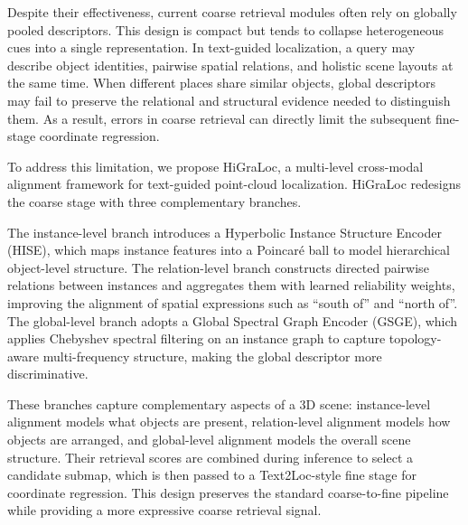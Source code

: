 \documentclass{article}
\begin{document}
Despite their effectiveness, current coarse retrieval modules often rely on globally pooled descriptors. This design is compact but tends to collapse heterogeneous cues into a single representation. In text-guided localization, a query may describe object identities, pairwise spatial relations, and holistic scene layouts at the same time. When different places share similar objects, global descriptors may fail to preserve the relational and structural evidence needed to distinguish them. As a result, errors in coarse retrieval can directly limit the subsequent fine-stage coordinate regression.

To address this limitation, we propose HiGraLoc, a multi-level cross-modal alignment framework for text-guided point-cloud localization. HiGraLoc redesigns the coarse stage with three complementary branches. 

The instance-level branch introduces a Hyperbolic Instance Structure Encoder (HISE), which maps instance features into a Poincaré ball to model hierarchical object-level structure. The relation-level branch constructs directed pairwise relations between instances and aggregates them with learned reliability weights, improving the alignment of spatial expressions such as ``south of'' and ``north of''. The global-level branch adopts a Global Spectral Graph Encoder (GSGE), which applies Chebyshev spectral filtering on an instance graph to capture topology-aware multi-frequency structure, making the global descriptor more discriminative.

These branches capture complementary aspects of a 3D scene: instance-level alignment models what objects are present, relation-level alignment models how objects are arranged, and global-level alignment models the overall scene structure. Their retrieval scores are combined during inference to select a candidate submap, which is then passed to a Text2Loc-style fine stage for coordinate regression. This design preserves the standard coarse-to-fine pipeline while providing a more expressive coarse retrieval signal.
\end{document}
